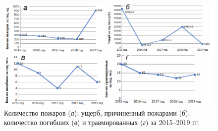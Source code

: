 \begin{figure}[h!]

  \begin{center}
    \includegraphics[width=1.2\textwidth]{authors/zelencov_fig1.png}
  \end{center}
  \caption{Количество пожаров (\textit{а}); ущерб, причиненный пожарами (\textit{б}); количество погибших (\textit{в}) и травмированных (\textit{г}) за 2015--2019 гг.}
  \label{fig:/zelencov_fig1}
\end{figure}
